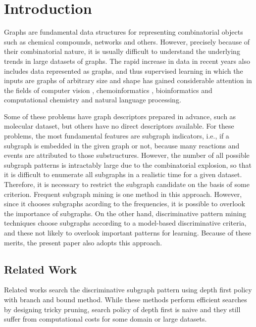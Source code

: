 \section{Introduction}
Graphs are fundamental data structures for representing combinatorial objects 
such as chemical compounds, networks and others.
However, precisely because of their combinatorial nature, 
it is usually difficult to understand the underlying trends in large datasets of graphs.
The rapid increase in data in recent years also includes data
represented as graphs, and thus supervised learning in which the inputs are graphs of
arbitrary size and shape has gained considerable attention
in the fields of computer vision \cite{Harchaoui:2007, Nowozin:2007, Barra:2013, Bai:2014a},
chemoinformatics \cite{Kashima:2003, Tsuda:2007,Saigo:2008a, Saigo:2009,Mahe:2009, 
Vishwanathan:2010, Shrvashidze:2011, Takigawa:2013, takigawa:2017},
bioinformatics\cite{Borgwardt:2005, Karklin:2005, Takigawa:2011b} 
and computational chemistry\cite{Kearnes2016, gilmer:2017} 
and natural language processing\cite{Kudo:2005}. 

Some of these problems have graph descriptors prepared in advance, 
such as molecular dataset\cite{james:2004, durant:2002}, 
but others have no direct descriptors available.
For these problems, the most fundamental features are subgraph indicators, 
i.e., if a subgraph is embedded in the given graph or not,
because many reactions and events are attributed to those substructures.
However, the number of all possible subgraph patterns is intractably large 
due to the combinatorial explosion, 
so that it is difficult to enumerate all subgraphs in a realistic time for a given dataset.
Therefore, it is necessary to restrict the subgraph candidate on the basis of some criterion.
Frequent subgraph mining \cite{Yan:2002, Nijssen:2004} is one method in this approach.
However, since it chooses subgraphs acording to the frequencies, 
it is possible to overlook the importance of subgraphs.
On the other hand, discriminative pattern mining techniques \cite{Fan:2008, Saigo:2009, Shirakawa:2018} 
choose subgraphs according to a model-based discriminative criteria, 
and these not likely to overlook important patterns for learning.
Because of these merits, the present paper also adopts this approach.

\subsection{Related Work}
\label{sec:relatedwork}
Related works \cite{Saigo:2009, Shirakawa:2018} search the discriminative subgraph pattern
using depth first policy with branch and bound method.
While these methods perform efficient searches by designing tricky pruning, 
search policy of depth first is naive and 
they still suffer from computational costs for some domain or large datasets.

